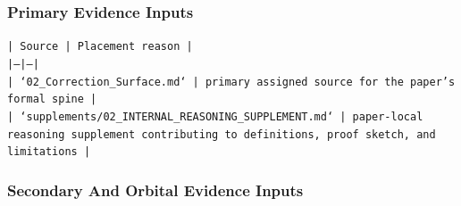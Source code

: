 \documentclass[11pt]{article}
\begin{document}
\subsubsection*{Primary Evidence Inputs}

\noindent\texttt{| Source | Placement reason |}\\
\noindent\texttt{|---|---|}\\
\noindent\texttt{| `02\_Correction\_Surface.md` | primary assigned source for the paper's formal spine |}\\
\noindent\texttt{| `supplements/02\_INTERNAL\_REASONING\_SUPPLEMENT.md` | paper-local reasoning supplement contributing to definitions, proof sketch, and limitations |}\\

\subsubsection*{Secondary And Orbital Evidence Inputs}
\end{document}
